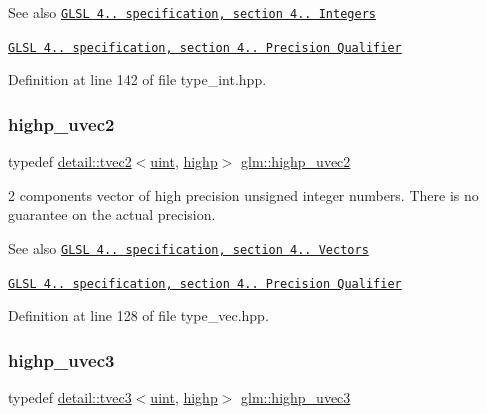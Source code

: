 \begin{DoxySeeAlso}{See also}
\href{http://www.opengl.org/registry/doc/GLSLangSpec.4.20.8.pdf}{\tt G\+L\+SL 4.. specification, section 4.. Integers} 

\href{http://www.opengl.org/registry/doc/GLSLangSpec.4.20.8.pdf}{\tt G\+L\+SL 4.. specification, section 4.. Precision Qualifier} 
\end{DoxySeeAlso}


Definition at line 142 of file type\+\_\+int.\+hpp.

\mbox{\label{group__core__precision_gaaf92be4c1fca33cff90c1ed15b521c79}} 
\subsubsection{\texorpdfstring{highp\+\_\+uvec2}{highp\_uvec2}}
{\footnotesize\ttfamily typedef \hyperlink{structglm_1_1detail_1_1tvec2}{detail\+::tvec2}$<$\hyperlink{group__core__precision_ga4fd29415871152bfb5abd588334147c8}{uint}, \hyperlink{namespaceglm_a0f04f086094c747d227af4425893f545ac6f7eab42eacbb10d59a58e95e362074}{highp}$>$ \hyperlink{group__core__precision_gaaf92be4c1fca33cff90c1ed15b521c79}{glm\+::highp\+\_\+uvec2}}

2 components vector of high precision unsigned integer numbers. There is no guarantee on the actual precision.

\begin{DoxySeeAlso}{See also}
\href{http://www.opengl.org/registry/doc/GLSLangSpec.4.20.8.pdf}{\tt G\+L\+SL 4.. specification, section 4.. Vectors} 

\href{http://www.opengl.org/registry/doc/GLSLangSpec.4.20.8.pdf}{\tt G\+L\+SL 4.. specification, section 4.. Precision Qualifier} 
\end{DoxySeeAlso}


Definition at line 128 of file type\+\_\+vec.\+hpp.

\mbox{\label{group__core__precision_ga66d0e4ae1742ede2eb32bf0bfedd7474}} 
\subsubsection{\texorpdfstring{highp\+\_\+uvec3}{highp\_uvec3}}
{\footnotesize\ttfamily typedef \hyperlink{structglm_1_1detail_1_1tvec3}{detail\+::tvec3}$<$\hyperlink{group__core__precision_ga4fd29415871152bfb5abd588334147c8}{uint}, \hyperlink{namespaceglm_a0f04f086094c747d227af4425893f545ac6f7eab42eacbb10d59a58e95e362074}{highp}$>$ \hyperlink{group__core__precision_ga66d0e4ae1742ede2eb32bf0bfedd7474}{glm\+::highp\+\_\+uvec3}}

